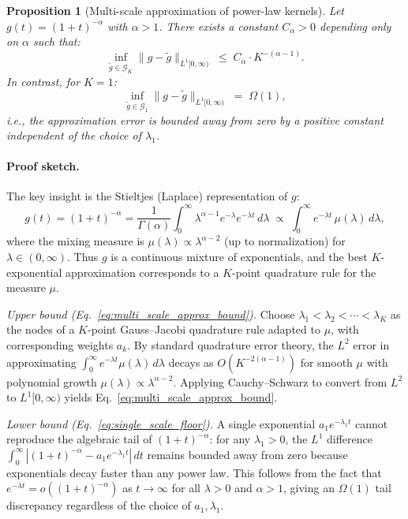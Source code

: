 \documentclass{article}
\newtheorem{proposition}{Proposition}
\begin{document}
\begin{proposition}[Multi-scale approximation of power-law kernels]
\label{prop:kernel_approx}
Let $g(t) = (1+t)^{-\alpha}$ with $\alpha > 1$.
There exists a constant $C_\alpha > 0$ depending only on $\alpha$ such that:
\begin{equation}
\inf_{\tilde{g} \in \mathcal{G}_K} \|g - \tilde{g}\|_{L^1[0,\infty)} \;\leq\; C_\alpha \cdot K^{-(\alpha-1)}.
\label{eq:multi_scale_approx_bound}
\end{equation}
In contrast, for $K=1$:
\begin{equation}
\inf_{\tilde{g} \in \mathcal{G}_1} \|g - \tilde{g}\|_{L^1[0,\infty)} \;=\; \Omega(1),
\label{eq:single_scale_floor}
\end{equation}
i.e., the approximation error is bounded away from zero by a positive constant independent of the choice of $\lambda_1$.
\end{proposition}

\paragraph{Proof sketch.}
The key insight is the Stieltjes (Laplace) representation of $g$:
\begin{equation}
g(t) = (1+t)^{-\alpha} = \frac{1}{\Gamma(\alpha)} \int_0^\infty \lambda^{\alpha-1} e^{-\lambda} e^{-\lambda t}\, d\lambda \;\propto\; \int_0^\infty e^{-\lambda t}\, \mu(\lambda)\, d\lambda,
\label{eq:stieltjes}
\end{equation}
where the mixing measure is $\mu(\lambda) \propto \lambda^{\alpha-2}$ (up to normalization) for $\lambda \in (0, \infty)$.
Thus $g$ is a continuous mixture of exponentials, and the best $K$-exponential approximation corresponds to a $K$-point quadrature rule for the measure $\mu$.

\emph{Upper bound (Eq.~\eqref{eq:multi_scale_approx_bound}).}
Choose $\lambda_1 < \lambda_2 < \cdots < \lambda_K$ as the nodes of a $K$-point Gauss--Jacobi quadrature rule adapted to $\mu$, with corresponding weights $a_k$.
By standard quadrature error theory, the $L^2$ error in approximating $\int_0^\infty e^{-\lambda t} \mu(\lambda)\, d\lambda$ decays as $O(K^{-2(\alpha-1)})$ for smooth $\mu$ with polynomial growth $\mu(\lambda) \propto \lambda^{\alpha-2}$.
Applying Cauchy--Schwarz to convert from $L^2$ to $L^1[0,\infty)$ yields Eq.~\eqref{eq:multi_scale_approx_bound}.

\emph{Lower bound (Eq.~\eqref{eq:single_scale_floor}).}
A single exponential $a_1 e^{-\lambda_1 t}$ cannot reproduce the algebraic tail of $(1+t)^{-\alpha}$: for any $\lambda_1 > 0$, the $L^1$ difference $\int_0^\infty |(1+t)^{-\alpha} - a_1 e^{-\lambda_1 t}|\, dt$ remains bounded away from zero because exponentials decay faster than any power law.
This follows from the fact that $e^{-\lambda t} = o((1+t)^{-\alpha})$ as $t \to \infty$ for all $\lambda > 0$ and $\alpha > 1$, giving an $\Omega(1)$ tail discrepancy regardless of the choice of $a_1, \lambda_1$.
\end{document}
